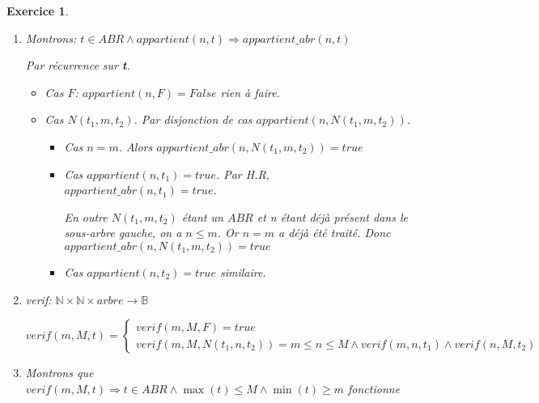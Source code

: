 \documentclass{article}
\theoremstyle{plain}
\newtheorem{exo}{Exercice}%
\begin{document}
\begin{exo}
\begin{enumerate}
\begin{itemize}
\begin{itemize}
                        donc par H.R $appartient(n, t_1) = True$, donc $appartient(n, N(t_1, m, t_2)) = true$.
                    \item Cas $m < n \wedge \ldots$ similaire.
                \end{itemize}
        \end{itemize}
    
        \item Montrons: $t \in ABR \wedge appartient(n, t) \Rightarrow appartient\_abr(n, t)$
    
        Par récurrence sur \textbf{t}.
        \begin{itemize}
            \item Cas $F$: $appartient(n, F) = False$ rien à faire.
            \item Cas $N(t_1, m, t_2)$. Par disjonction de cas $appartient(n, N(t_1, m, t_2))$.
                \begin{itemize}
                    \item Cas $n = m$. Alors $appartient\_abr(n, N(t_1, m, t_2)) = true$
                    \item Cas $appartient(n, t_1) = true$. Par H.R, $appartient\_abr(n, t_1) = true$.
                    
                        En outre $N(t_1, m, t_2)$ étant un $ABR$ et n étant déjà présent dans le sous-arbre
                        gauche, on a $n \leq m$. Or $n = m$ a déjà été traité.
                        Donc $appartient\_abr(n, N(t_1, m, t_2)) = true$
                    \item Cas $appartient(n, t_2) = true$ similaire.
                \end{itemize}
        \end{itemize}

    \item verif: $\mathbb{N} \times \mathbb{N} \times arbre \rightarrow \mathbb{B}$
    
    \[ verif(m, M, t) =
    \begin{cases}
        verif(m, M, F) = true \\
        verif(m, M, N(t_1, n, t_2)) = m \leq n \leq M \wedge verif(m, n, t_1) \wedge verif(n, M, t_2)
    \end{cases}
    \]

    \item Montrons que $verif(m, M, t) \Rightarrow t \in ABR \wedge 
            \max(t) \leq M \wedge \min(t) \geq m$ fonctionne


\end{enumerate}
\end{exo}
\end{document}
